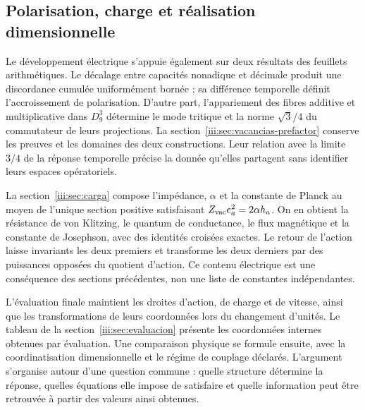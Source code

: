 \subsection{Polarisation, charge et réalisation dimensionnelle}

Le développement électrique s’appuie également sur deux résultats des
feuillets arithmétiques. Le décalage entre capacités nonadique et décimale
produit une discordance cumulée uniformément bornée ; sa différence
temporelle définit l’accroissement de polarisation. D’autre part,
l’appariement des fibres additive et multiplicative dans $D_9^3$
détermine le mode tritique et la norme $\sqrt3/4$ du commutateur de leurs
projections. La section~\ref{iii:sec:vacancias-prefactor} conserve
les preuves et les domaines des deux constructions. Leur relation avec
la limite $3/4$ de la réponse temporelle précise la donnée qu’elles partagent
sans identifier leurs espaces opératoriels.

La section~\ref{iii:sec:carga} compose l’impédance, $\alpha$ et la
constante de Planck au moyen de l’unique section positive satisfaisant
$Z_{\rm vac}e_a^2=2\alpha h_a$. On en obtient la résistance de
von Klitzing, le quantum de conductance, le flux magnétique et la constante de
Josephson, avec des identités croisées exactes. Le retour de l’action
laisse invariants les deux premiers et transforme les deux derniers par
des puissances opposées du quotient d’action. Ce contenu électrique
est une conséquence des sections précédentes, non une liste de
constantes indépendantes.

L’évaluation finale maintient les droites d’action, de charge et de vitesse,
ainsi que les transformations de leurs coordonnées lors du changement d’unités.
Le tableau de la section~\ref{iii:sec:evaluacion} présente les coordonnées
internes obtenues par évaluation. Une comparaison physique se formule ensuite, avec la coordinatisation
dimensionnelle et le régime de couplage déclarés. L’argument
s’organise autour d’une question commune : quelle structure détermine la
réponse, quelles équations elle impose de satisfaire et quelle information peut
être retrouvée à partir des valeurs ainsi obtenues.
